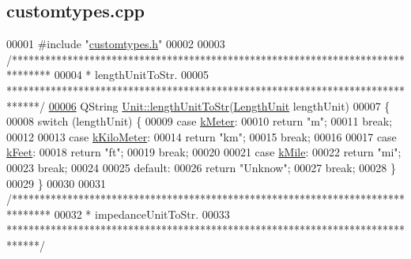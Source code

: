 \hypertarget{customtypes_8cpp_source}{}\subsection{customtypes.\+cpp}
\label{customtypes_8cpp_source}

\begin{DoxyCode}
00001 \textcolor{preprocessor}{#include "\hyperlink{customtypes_8h}{customtypes.h}"}
00002 
00003 \textcolor{comment}{/*******************************************************************************}
00004 \textcolor{comment}{ * lengthUnitToStr.}
00005 \textcolor{comment}{ ******************************************************************************/}
\hypertarget{customtypes_8cpp_source_l00006}{}\hyperlink{class_unit_abd363319f79f97b0a0b9a08c5ddc3cdb}{00006} QString \hyperlink{class_unit_abd363319f79f97b0a0b9a08c5ddc3cdb}{Unit::lengthUnitToStr}(\hyperlink{class_unit_a8c8921f7b225ad6063b1cb573425b9a0}{LengthUnit} lengthUnit)
00007 \{
00008   \textcolor{keywordflow}{switch} (lengthUnit) \{
00009   \textcolor{keywordflow}{case} \hyperlink{class_unit_a8c8921f7b225ad6063b1cb573425b9a0abfa41ebe7ee649a1f02c9b8ae570434b}{kMeter}:
00010     \textcolor{keywordflow}{return} \textcolor{stringliteral}{"m"};
00011     \textcolor{keywordflow}{break};
00012 
00013   \textcolor{keywordflow}{case} \hyperlink{class_unit_a8c8921f7b225ad6063b1cb573425b9a0a1c04f3dd196dbe1832a2658215b0d919}{kKiloMeter}:
00014     \textcolor{keywordflow}{return} \textcolor{stringliteral}{"km"};
00015     \textcolor{keywordflow}{break};
00016 
00017   \textcolor{keywordflow}{case} \hyperlink{class_unit_a8c8921f7b225ad6063b1cb573425b9a0a9ac9b167b0ebce477fb53d6ace04ddc8}{kFeet}:
00018     \textcolor{keywordflow}{return} \textcolor{stringliteral}{"ft"};
00019     \textcolor{keywordflow}{break};
00020 
00021   \textcolor{keywordflow}{case} \hyperlink{class_unit_a8c8921f7b225ad6063b1cb573425b9a0a2ebde742068bbee0510de32fbb4cd724}{kMile}:
00022     \textcolor{keywordflow}{return} \textcolor{stringliteral}{"mi"};
00023     \textcolor{keywordflow}{break};
00024 
00025   \textcolor{keywordflow}{default}:
00026     \textcolor{keywordflow}{return} \textcolor{stringliteral}{"Unknow"};
00027     \textcolor{keywordflow}{break};
00028   \}
00029 \}
00030 
00031 \textcolor{comment}{/*******************************************************************************}
00032 \textcolor{comment}{ * impedanceUnitToStr.}
00033 \textcolor{comment}{ ******************************************************************************/}

\end{DoxyCode}
